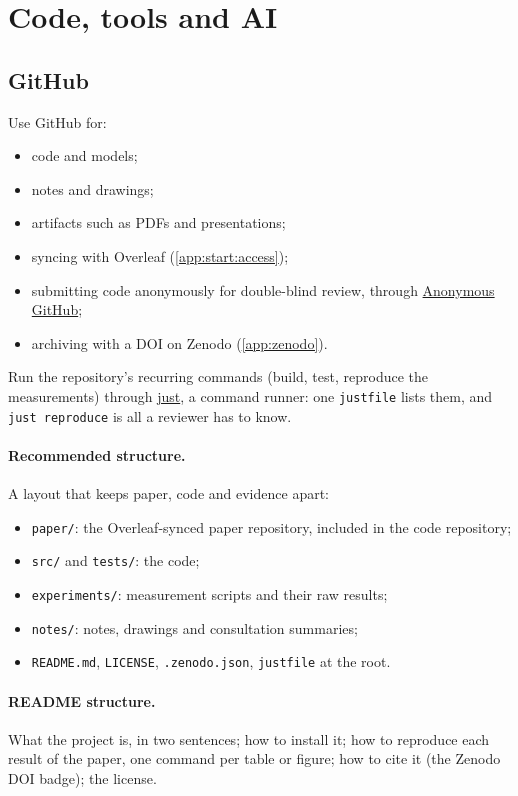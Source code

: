 \clearpage\section{Code, tools and AI}\label{app:code}
\subsection{GitHub}\label{app:code:github}
Use GitHub for:
\begin{itemize}[noitemsep]
  \item code and models;
  \item notes and drawings;
  \item artifacts such as PDFs and presentations;
  \item syncing with Overleaf (\cref{app:start:access});
  \item submitting code anonymously for double-blind review, through \href{https://anonymous.4open.science/}{Anonymous GitHub};
  \item archiving with a DOI on Zenodo (\cref{app:zenodo}).
\end{itemize}
Run the repository's recurring commands (build, test, reproduce the measurements) through \href{https://github.com/casey/just}{just}, a command runner: one \texttt{justfile} lists them, and \texttt{just reproduce} is all a reviewer has to know.

\paragraph{Recommended structure.} A layout that keeps paper, code and evidence apart:
\begin{itemize}[noitemsep]
  \item \texttt{paper/}: the Overleaf-synced paper repository, included in the code repository;
  \item \texttt{src/} and \texttt{tests/}: the code;
  \item \texttt{experiments/}: measurement scripts and their raw results;
  \item \texttt{notes/}: notes, drawings and consultation summaries;
  \item \texttt{README.md}, \texttt{LICENSE}, \texttt{.zenodo.json}, \texttt{justfile} at the root.
\end{itemize}

\paragraph{README structure.} What the project is, in two sentences; how to install it; how to reproduce each result of the paper, one command per table or figure; how to cite it (the Zenodo DOI badge); the license.

